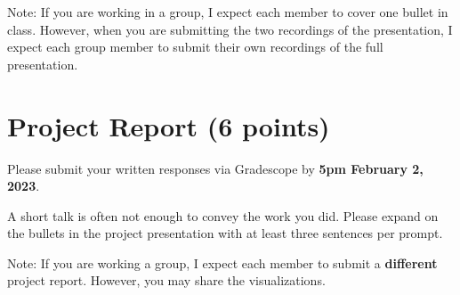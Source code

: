 \documentclass{article}
\begin{document}
Note: If you are working in a group, I expect each member to
cover one bullet in class.
However, when you are submitting the two recordings of the presentation,
I expect each group member to submit their own recordings of the full
presentation.

\section{Project Report (6 points)}
Please submit your written responses via Gradescope
by \textbf{5pm February 2, 2023}.

A short talk is often not enough to convey the work you did.
Please expand on the bullets in the project presentation with
at least three sentences per prompt.

Note: If you are working a group, I expect each member to submit
a \textbf{different} project report.
However, you may share the visualizations.
\end{document}

